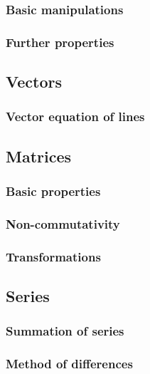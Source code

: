 \documentclass{article}
\begin{document}
\subsubsection{Basic manipulations}


\subsubsection{Further properties}



\subsection{Vectors}

\subsubsection{Vector equation of lines}



\subsection{Matrices}

\subsubsection{Basic properties}


\subsubsection{Non-commutativity}


\subsubsection{Transformations}



\subsection{Series}

\subsubsection{Summation of series}


\subsubsection{Method of differences}

\end{document}
